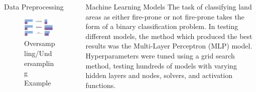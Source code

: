 \documentclass[final]{beamer}
\newlength{\colwidth}
\begin{document}
\begin{frame}[t]
\begin{columns}[t]
\begin{column}{\colwidth}
\begin{block}{Data Preprocessing}
\begin{figure}
\begin{minipage}{0.5\textwidth}
            \includegraphics[width=0.95\textwidth]{images/UnderOver.jpeg}
            \caption{Oversampling/Undersampling Example}
            \label{fig:wind.png}
        \end{minipage}
    \end{figure}
    
  \end{block}

\end{column}



\begin{column}{\colwidth}

  \begin{exampleblock}{Machine Learning Models}
    The task of classifying land areas as either fire-prone or not fire-prone takes the form of a binary classification problem. In testing different models, the method which produced the best results was the Multi-Layer Perceptron (MLP) model. Hyperparameters were tuned using a grid search method, testing hundreds of models with varying hidden layers and nodes, solvers, and activation functions. 
    

\end{exampleblock}
\end{column}
\end{columns}
\end{frame}
\end{document}
